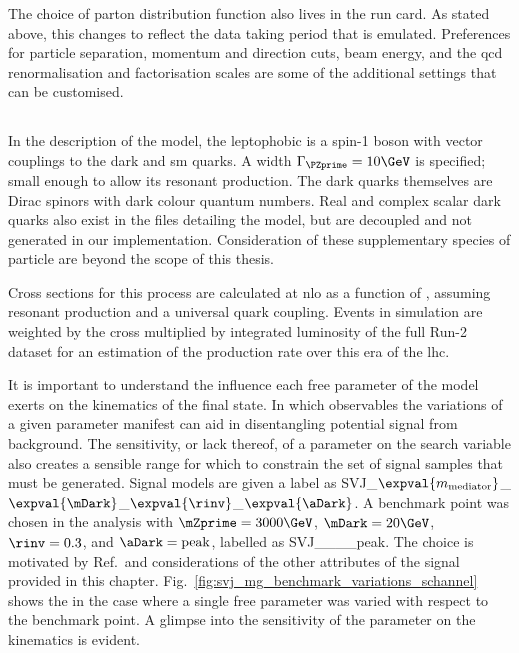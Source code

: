 The choice of parton distribution function also lives in the run card. As stated above, this changes to reflect the data taking period that is emulated. Preferences for particle separation, momentum and direction cuts, beam energy, and the \acrshort{qcd} renormalisation and factorisation scales are some of the additional settings that can be customised.




\subsection{\texorpdfstring{\schannel}{s-channel}}
\label{subsec:svj_signal_madgraph_schannel}

In the description of the \schannel model, the leptophobic \PZprime is a spin-1 boson with vector couplings to the dark and \acrshort{sm} quarks. A width $\Gamma_{\PZprime} = \text{10}\GeV$ is specified; small enough to allow its resonant production. The dark quarks themselves are Dirac spinors with dark colour quantum numbers. Real and complex scalar dark quarks also exist in the files detailing the model, but are decoupled and not generated in our implementation. Consideration of these supplementary species of particle are beyond the scope of this thesis.

Cross sections for this process are calculated at \acrshort{nlo} as a function of \mZprime, assuming resonant production and a universal quark coupling. Events in simulation are weighted by the cross multiplied by integrated luminosity of the full Run-2 dataset for an estimation of the production rate over this era of the \acrshort{lhc}. %

It is important to understand the influence each free parameter of the model exerts on the kinematics of the final state. In which observables the variations of a given parameter manifest can aid in disentangling potential signal from background. The sensitivity, or lack thereof, of a parameter on the search variable also creates a sensible range for which to constrain the set of signal samples that must be generated. Signal models are given a label as SVJ\_\-$\expval{m_{\mathrm{mediator}}}$\_\-$\expval{\mDark}$\_\-$\expval{\rinv}$\_\-$\expval{\aDark}$. A benchmark point was chosen in the analysis with $\mZprime = \text{3000}\GeV$, $\mDark = \text{20}\GeV$, $\rinv = \text{0.3}$, and $\aDark = \text{peak}$, labelled as SVJ\_\_\_\_\-peak. The choice is motivated by Ref.~and considerations of the other attributes of the signal provided in this chapter. Fig.~\ref{fig:svj_mg_benchmark_variations_schannel} shows the \mT in the case where a single free parameter was varied with respect to the benchmark point. A glimpse into the sensitivity of the parameter on the kinematics is evident.


